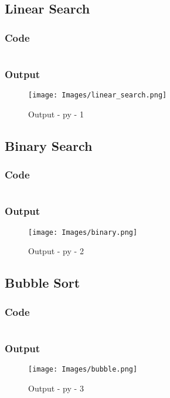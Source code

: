 \subsection{Linear Search}

\subsubsection{Code}
\inputminted[]{python}{./code/linear_search.py}

\subsubsection{Output}
\begin{figure}[!htb]
  \centering
  \texttt{[image: Images/linear\_search.png]}
  \label{output:py-1}
  \caption{Output - py - 1}
\end{figure}

\pagebreak

\subsection{Binary Search}

\subsubsection{Code}

\inputminted[]{python}{./code/binary_search.py}

\subsubsection{Output}
\begin{figure}[!htb]
  \centering
  \texttt{[image: Images/binary.png]}
  \label{output:py-2}
  \caption{Output - py - 2}
\end{figure}
\pagebreak

\subsection{Bubble Sort}

\subsubsection{Code}

\inputminted[]{python}{./code/bubble_sort.py}

\subsubsection{Output}
\begin{figure}[!htb]
  \centering
  \texttt{[image: Images/bubble.png]}
  \label{output:py-3}
  \caption{Output - py - 3}
\end{figure}
\pagebreak

